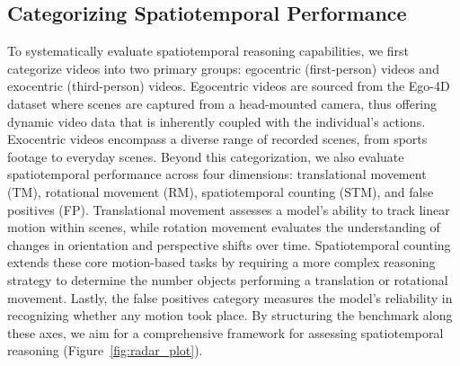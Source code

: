 \subsection{Categorizing Spatiotemporal Performance}
To systematically evaluate spatiotemporal reasoning capabilities, we first categorize videos into two primary groups: egocentric (first-person) videos and exocentric (third-person) videos. Egocentric videos are sourced from the Ego-4D~\cite{grauman2022ego4d} dataset where scenes are captured from a head-mounted camera, thus offering dynamic video data that is inherently coupled with the individual's actions. Exocentric videos encompass a diverse range of recorded scenes, from sports footage to everyday scenes. Beyond this categorization, we also evaluate spatiotemporal performance across four dimensions: translational movement (TM), rotational movement (RM), spatiotemporal counting (STM), and false positives (FP). Translational movement assesses a model's ability to track linear motion within scenes, while rotation movement evaluates the understanding of changes in orientation and perspective shifts over time. Spatiotemporal counting extends these core motion-based tasks by requiring a more complex reasoning strategy to determine the number objects performing a translation or rotational movement. Lastly, the false positives category measures the model's reliability in recognizing whether any motion took place. By structuring the benchmark along these axes, we aim for a comprehensive framework for assessing spatiotemporal reasoning (Figure~\ref{fig:radar_plot}).
